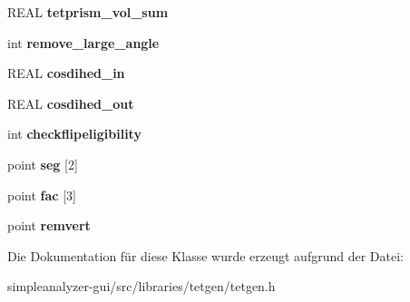 \begin{DoxyCompactItemize}
\item 
\hypertarget{classtetgenmesh_1_1flipconstraints_a8bb8c96375bd68188384dd8cb34e0a28}{R\-E\-A\-L {\bfseries tetprism\-\_\-vol\-\_\-sum}}\label{classtetgenmesh_1_1flipconstraints_a8bb8c96375bd68188384dd8cb34e0a28}

\item 
\hypertarget{classtetgenmesh_1_1flipconstraints_abc7659ab61a966b1a47560fd07a58ccb}{int {\bfseries remove\-\_\-large\-\_\-angle}}\label{classtetgenmesh_1_1flipconstraints_abc7659ab61a966b1a47560fd07a58ccb}

\item 
\hypertarget{classtetgenmesh_1_1flipconstraints_a04bbb705181108809fa35a24fd2b32b0}{R\-E\-A\-L {\bfseries cosdihed\-\_\-in}}\label{classtetgenmesh_1_1flipconstraints_a04bbb705181108809fa35a24fd2b32b0}

\item 
\hypertarget{classtetgenmesh_1_1flipconstraints_a546d64ebfd4f8bb01b5f4f56dde43a07}{R\-E\-A\-L {\bfseries cosdihed\-\_\-out}}\label{classtetgenmesh_1_1flipconstraints_a546d64ebfd4f8bb01b5f4f56dde43a07}

\item 
\hypertarget{classtetgenmesh_1_1flipconstraints_a4eb3f0e12749cae8b73f0f80e6f7748c}{int {\bfseries checkflipeligibility}}\label{classtetgenmesh_1_1flipconstraints_a4eb3f0e12749cae8b73f0f80e6f7748c}

\item 
\hypertarget{classtetgenmesh_1_1flipconstraints_a65862c9f061693a1961f96f3f471c95e}{point {\bfseries seg} \mbox{[}2\mbox{]}}\label{classtetgenmesh_1_1flipconstraints_a65862c9f061693a1961f96f3f471c95e}

\item 
\hypertarget{classtetgenmesh_1_1flipconstraints_a99946dec792882c06d7608bb9967e5bb}{point {\bfseries fac} \mbox{[}3\mbox{]}}\label{classtetgenmesh_1_1flipconstraints_a99946dec792882c06d7608bb9967e5bb}

\item 
\hypertarget{classtetgenmesh_1_1flipconstraints_a1a6025cc57533d98fef46ffbdcbbc83f}{point {\bfseries remvert}}\label{classtetgenmesh_1_1flipconstraints_a1a6025cc57533d98fef46ffbdcbbc83f}

\end{DoxyCompactItemize}


Die Dokumentation für diese Klasse wurde erzeugt aufgrund der Datei\-:\begin{DoxyCompactItemize}
\item 
simpleanalyzer-\/gui/src/libraries/tetgen/tetgen.\-h\end{DoxyCompactItemize}
